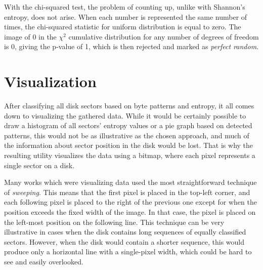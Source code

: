 \documentclass[
  digital, %
  color,   %
  oneside, %
  lof,     %
  nolot,     %
]{fithesis4}
\begin{document}
With the chi-squared test, the problem of counting up, unlike with Shannon's entropy, does not arise. When each number is represented the same number of times, the chi-squared statistic for uniform distribution is equal to zero. The image of 0 in the $\chi^2$ cumulative distribution for any number of degrees of freedom is 0, giving the p-value of 1, which is then rejected and marked as \emph{perfect random}.

\section{Visualization}
\label{sec:visualization}
After classifying all disk sectors based on byte patterns and entropy, it all comes down to visualizing the gathered data.
While it would be certainly possible to draw a histogram of all sectors' entropy values or a pie graph based on detected patterns, this would not be as illustrative as the chosen approach, and much of the information about sector position in the disk would be lost.
That is why the resulting utility visualizes the data using a bitmap, where each pixel represents a single sector on a disk.

Many works which were visualizing data used the most straightforward technique of \emph{sweeping}. \cite{hargreaves13, charalampidis18, broz11}
This means that the first pixel is placed in the top-left corner, and each following pixel is placed to the right of the previous one except for when the position exceeds the fixed width of the image.
In that case, the pixel is placed on the left-most position on the following line.
This technique can be very illustrative in cases when the disk contains long sequences of equally classified sectors.
However, when the disk would contain a shorter sequence, this would produce only a horizontal line with a single-pixel width, which could be hard to see and easily overlooked. 

\end{document}

